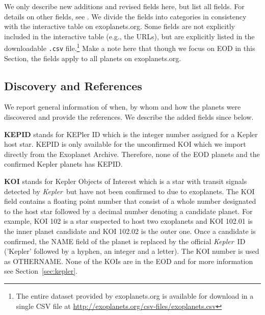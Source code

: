 \documentclass[11pt,preprint]{aastex}
\def\kepler{\textit{Kepler}}
\begin{document}
\begin{CJK*}{UTF8}{gbsn}
We only describe new additions and revised fields here, but list all
fields. For details on other fields, see \cite{Wright2011}. We divide
the fields into categories in consistency with the interactive table
on exoplanets.org. Some fields are not explicitly included in the
interactive table (e.g., the URLs), but are explicitly listed in the
downloadable {\tt .csv} file.\footnote{The entire dataset provided by
  exoplanets.org is available for download in a single CSV file at
  \url{http://exoplanets.org/csv-files/exoplanets.csv}} Make a note
here that though we focus on EOD in this Section, the fields apply to
all planets on exoplanets.org.

\subsection{Discovery and References}\label{sec:disc}

We report general information of when, by whom and how the planets
were discovered and provide the references. We describe the added
fields since \cite{Wright2011} below.

{\bf KEPID} stands for KEPler ID which is the integer number assigned
for a Kepler host star. KEPID is only available for the unconfirmed
KOI which we import directly from the Exoplanet Archive. Therefore,
none of the EOD planets and the confirmed Kepler planets has KEPID.

{\bf KOI} stands for Kepler Objects of Interest which is a star with
transit signals detected by \kepler\ but have not been confirmed to
due to exoplanets. The KOI field contains a floating point number that
consist of a whole number designated to the host star followed by a
decimal number denoting a candidate planet. For example, KOI 102 is a
star suspected to host two exoplanets and KOI 102.01 is the inner
planet candidate and KOI 102.02 is the outer one. Once a candidate is
confirmed, the NAME field of the planet is replaced by the official
\kepler\ ID ('Kepler' followed by a hyphen, an integer and a
letter). The KOI number is used as OTHERNAME. None of the KOIs are in
the EOD and for more information see Section~\ref{sec:kepler}.


\end{CJK*}
\end{document}
